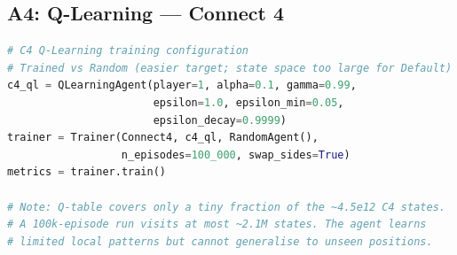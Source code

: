 \documentclass[12pt, a4paper]{article}
\begin{document}
\subsection{A4: Q-Learning --- Connect 4}
\begin{lstlisting}[language=Python, caption={Q-Learning Connect 4 training configuration (vs random opponent).}]
# C4 Q-Learning training configuration
# Trained vs Random (easier target; state space too large for Default)
c4_ql = QLearningAgent(player=1, alpha=0.1, gamma=0.99,
                       epsilon=1.0, epsilon_min=0.05,
                       epsilon_decay=0.9999)
trainer = Trainer(Connect4, c4_ql, RandomAgent(),
                  n_episodes=100_000, swap_sides=True)
metrics = trainer.train()

# Note: Q-table covers only a tiny fraction of the ~4.5e12 C4 states.
# A 100k-episode run visits at most ~2.1M states. The agent learns
# limited local patterns but cannot generalise to unseen positions.
\end{lstlisting}
\end{document}
